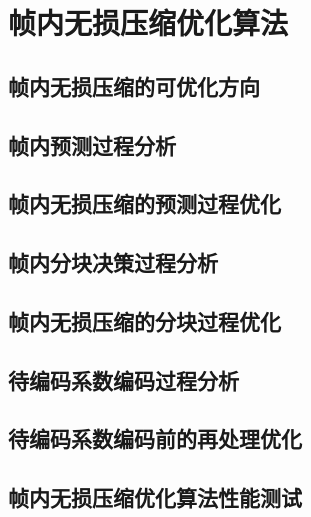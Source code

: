 \chapter{帧内无损压缩优化算法}
\label{cha:c3}

\section{帧内无损压缩的可优化方向}

\section{帧内预测过程分析}

\section{帧内无损压缩的预测过程优化}

\section{帧内分块决策过程分析}

\section{帧内无损压缩的分块过程优化}

\section{待编码系数编码过程分析}

\section{待编码系数编码前的再处理优化}

\section{帧内无损压缩优化算法性能测试}